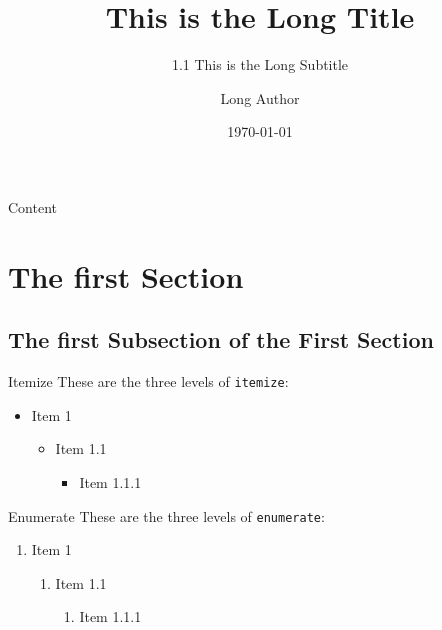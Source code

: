 \documentclass[aspectratio=169]{beamer}
\title[Short Title]{This is the Long Title}
\subtitle[1.1 Short Subtitle]{1.1 This is the Long Subtitle}
\author[Short Author]{Long Author}
\date{\today}
\begin{document}
    
    \maketitle

    \begin{frame}{Content}
        \tableofcontents
    \end{frame}
    
    \section[First Section]{The first Section}

    \subsection[First Subsection]{The first Subsection of the First Section}
   
    \begin{frame}{Itemize}
        These are the three levels of \texttt{itemize}:
        \begin{itemize}
            \item Item 1
            \begin{itemize}
                \item Item 1.1
                \begin{itemize}
                    \item Item 1.1.1
                \end{itemize}
            \end{itemize}
        \end{itemize}
    \end{frame}

    \begin{frame}{Enumerate}
        These are the three levels of \texttt{enumerate}:
        \begin{enumerate}
            \item Item 1
            \begin{enumerate}
                \item Item 1.1
                \begin{enumerate}
                    \item Item 1.1.1
                \end{enumerate}
            \end{enumerate}
        \end{enumerate}
    \end{frame}
\end{document}
